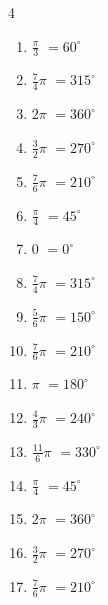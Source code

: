 \begin{multicols}{4}
\begin{enumerate}
  \item $\displaystyle \frac{\pi}{3}$
        $\displaystyle =60^{\circ}$

  \item $\displaystyle \frac{7}{4}\pi$
        $\displaystyle =315^{\circ}$

  \item $\displaystyle 2\pi$
        $\displaystyle =360^{\circ}$

  \item $\displaystyle \frac{3}{2}\pi$
        $\displaystyle =270^{\circ}$

  \item $\displaystyle \frac{7}{6}\pi$
        $\displaystyle =210^{\circ}$

  \item $\displaystyle \frac{\pi}{4}$
        $\displaystyle =45^{\circ}$

  \item $\displaystyle 0$
        $\displaystyle =0^{\circ}$

  \item $\displaystyle \frac{7}{4}\pi$
        $\displaystyle =315^{\circ}$

  \item $\displaystyle \frac{5}{6}\pi$
        $\displaystyle =150^{\circ}$

  \item $\displaystyle \frac{7}{6}\pi$
        $\displaystyle =210^{\circ}$

  \item $\displaystyle \pi$
        $\displaystyle =180^{\circ}$

  \item $\displaystyle \frac{4}{3}\pi$
        $\displaystyle =240^{\circ}$

  \item $\displaystyle \frac{11}{6}\pi$
        $\displaystyle =330^{\circ}$

  \item $\displaystyle \frac{\pi}{4}$
        $\displaystyle =45^{\circ}$

\columnbreak %

\resetques

  \item $\displaystyle 2\pi$
        $\displaystyle =360^{\circ}$

  \item $\displaystyle \frac{3}{2}\pi$
        $\displaystyle =270^{\circ}$

  \item $\displaystyle \frac{7}{6}\pi$
        $\displaystyle =210^{\circ}$


\end{enumerate}
\end{multicols}
